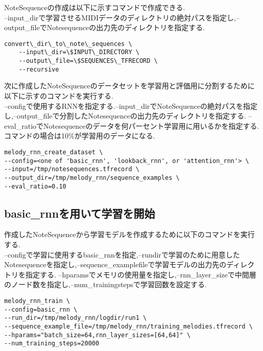 NoteSequenceの作成は以下に示すコマンドで作成できる.\\
--input\_dirで学習させるMIDIデータのディレクトリの絶対パスを指定し,--output\_fileでNotesequenceの出力先のディレクトリを指定する.\\
\begin{lstlisting}[basicstyle=\ttfamily\footnotesize,frame=single]
    convert\_dir\_to\_note\_sequences \
    --input\_dir=\$INPUT\_DIRECTORY \
    --output\_file=\$SEQUENCES\_TFRECORD \
    --recursive
\end{lstlisting}
次に作成したNoteSequenceのデータセットを学習用と評価用に分割するために以下に示すのコマンドを実行する.\\
--configで使用するRNNを指定する.--input\_dirでNoteSequenceの絶対パスを指定し,--output\_fileで分割したNotesequenceの出力先のディレクトリを指定する.
--eval\_ratioでNotesequenceのデータを何パーセント学習用に用いるかを指定する.コマンドの場合は10\%が学習用のデータになる.
\begin{lstlisting}[basicstyle=\ttfamily\footnotesize,frame=single]
melody_rnn_create_dataset \
--config=<one of 'basic_rnn', 'lookback_rnn', or 'attention_rnn'> \
--input=/tmp/notesequences.tfrecord \
--output_dir=/tmp/melody_rnn/sequence_examples \
--eval_ratio=0.10
\end{lstlisting}
\subsection{basic\_rnnを用いて学習を開始}
作成したNoteSequenceから学習モデルを作成するために以下のコマンドを実行する.\\
--configで学習に使用するbasic\_rnnを指定,--rundirで学習のために用意したNotesequenceを指定し,--sequence\_examplefileで学習モデルの出力先のディレクトリを指定する.
--hparamsでメモリの使用量を指定し,--rnn\_layer\_sizeで中間層のノード数を指定し,--num\_trainingstepsで学習回数を設定する.\\
\begin{lstlisting}[basicstyle=\ttfamily\footnotesize,frame=single]
melody_rnn_train \
--config=basic_rnn \
--run_dir=/tmp/melody_rnn/logdir/run1 \
--sequence_example_file=/tmp/melody_rnn/training_melodies.tfrecord \
--hparams="batch_size=64,rnn_layer_sizes=[64,64]" \
--num_training_steps=20000
\end{lstlisting}
